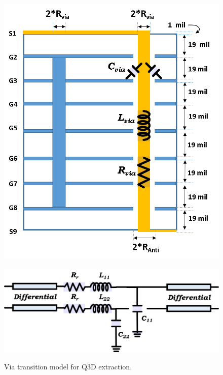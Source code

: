 \documentclass{book}  %
\begin{document}
\begin{paper}
\begin{figure}[htbp!]
\begin{minipage}[b]{0.5\linewidth}
		\includegraphics[width=\textwidth]{./img/PCB/Via_Transition/Via_transition_LC_modeling.png}
		\label{fig:pcb_via_lump}
	\end{minipage}
	\begin{minipage}[b]{\linewidth}
		\includegraphics[width=\textwidth]{./img/PCB/Via_Transition/lumped_model.png}
		\label{fig:pcb_via_lump_model}
	\end{minipage}
	\caption{Via transition model for Q3D extraction.}	
	\vskip0.2in	
\end{figure}


\end{paper}
\end{document}
